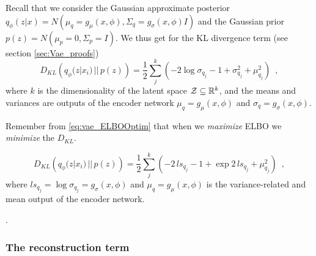 Recall that we consider the Gaussian approximate posterior $q_{\phi}(z|x) = N(\mu_q = g_{\mu}(x,\phi), \Sigma_q =
g_{\sigma}(x,\phi) I)$ and the Gaussian prior $p(z) = N(\mu_p = 0, \Sigma_p = I)$.
 We thus get for the KL divergence term (see section \ref{sec:Vae_proofs})
\begin{equation}
  D_{KL}\left( q_{\phi}(z|x_i) \, || \, p(z)\right) 
  = \frac{1}{2} \sum_j^k \left(- 2 \log \sigma_{q_j} - 1 + \sigma_{q_j}^2 + \mu^2_{q_j} \right) \enspace ,
\end{equation}
where $k$ is the dimensionality of the latent space $\mathcal{Z} \subseteq \mathbb{R}^k$, and the means and variances are outputs of the
encoder network $\mu_q = g_\mu(x,\phi)$ and $\sigma_q = g_\sigma(x, \phi)$.

Remember from \eqref{eq:vae_ELBOOptim} that when we \emph{maximize} ELBO we \emph{minimize} the $D_{KL}$.

\begin{equation}
  D_{KL}\left( q_{\phi}(z|x_i) \, || \, p(z)\right) 
  = \frac{1}{2} \sum_j^k \left(- 2 \, ls_{q_j} - 1 + \exp 2 \, ls_{q_j} + \mu^2_{q_j} \right) \enspace ,
\end{equation}
where $ls_{q_j} = \log \sigma_{q_j} = g_\sigma(x, \phi)$ and
$\mu_q = g_\mu(x, \phi)$ is the variance-related and mean output of
the encoder network.

.



\subsubsection{The reconstruction term}
\label{sec:Vae_reconstructionTerm}

